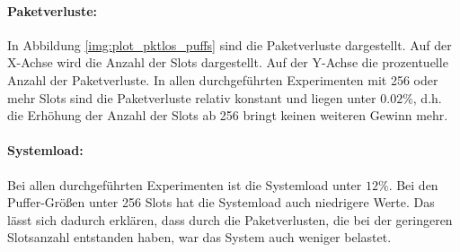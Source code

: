 \paragraph*{Paketverluste:}
In Abbildung \ref{img:plot_pktlos_puffs} sind die Paketverluste dargestellt.
Auf der X-Achse wird die Anzahl der Slots dargestellt. Auf der Y-Achse die
prozentuelle Anzahl der Paketverluste.  In allen durchgeführten Experimenten
mit 256 oder mehr Slots sind die Paketverluste relativ konstant und liegen
unter $0.02\%$, d.h. die Erhöhung der Anzahl der Slots ab 256 bringt keinen
weiteren Gewinn mehr. 

\paragraph*{Systemload:}
Bei allen durchgeführten Experimenten ist die Systemload unter $12\%$. Bei den
Puffer-Größen unter 256 Slots hat die Systemload auch niedrigere Werte. Das
lässt sich dadurch erklären, dass durch die Paketverlusten, die bei der
geringeren Slotsanzahl entstanden haben, war das System auch weniger belastet.

